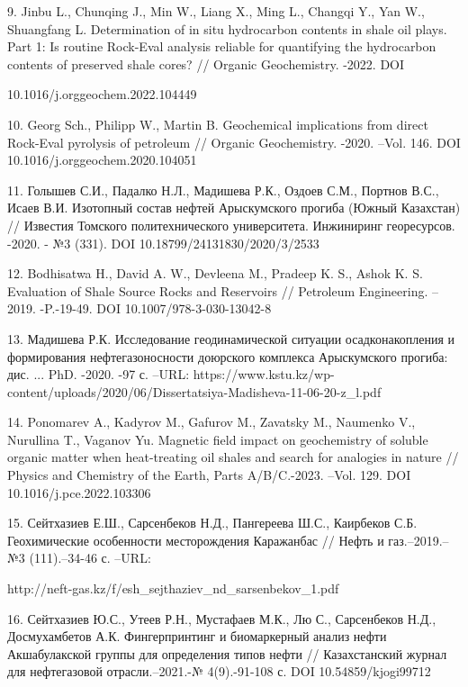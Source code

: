 \begin{noparindent}
9.
  Jinbu L., Chunqing J., Min W., Liang X., Ming L., Changqi Y., Yan W.,
  Shuangfang L. Determination of in situ hydrocarbon contents in shale
  oil plays. Part 1: Is routine Rock-Eval analysis reliable for
  quantifying the hydrocarbon contents of preserved shale cores? //
  Organic Geochemistry. -2022. DOI

  10.1016/j.orggeochem.2022.104449

10.
  Georg Sch., Philipp W., Martin B. Geochemical implications from direct
  Rock-Eval pyrolysis of petroleum // Organic Geochemistry. -2020.
  --Vol. 146. DOI 10.1016/j.orggeochem.2020.104051

11.
  Голышев С.И., Падалко Н.Л., Мадишева Р.К., Оздоев С.М., Портнов В.С.,
  Исаев В.И. Изотопный состав нефтей Арыскумского прогиба (Южный
  Казахстан) // Известия Томского политехнического университета.
  Инжиниринг георесурсов. -2020. - №3 (331). DOI
  10.18799/24131830/2020/3/2533

12.
  Bodhisatwa H., David A. W., Devleena M., Pradeep K. S., Ashok K. S.
  Evaluation of Shale Source Rocks and Reservoirs // Petroleum
  Engineering. --2019. -P.-19-49. DOI 10.1007/978-3-030-13042-8

13.
  Мадишева Р.К. Исследование геодинамической ситуации осадконакопления и
  формирования нефтегазоносности доюрского комплекса Арыскумского
  прогиба: дис. ... PhD. -2020. -97 с. --URL:
  https://www.kstu.kz/wp-content/uploads/2020/06/Dissertatsiya-Madisheva-11-06-20-z\_l.pdf

14.
  Ponomarev A., Kadyrov M., Gafurov M., Zavatsky M., Naumenko V.,
  Nurullina T., Vaganov Yu. Magnetic field impact on geochemistry of
  soluble organic matter when heat-treating oil shales and search for
  analogies in nature // Physics and Chemistry of the Earth, Parts
  A/B/C.-2023. --Vol. 129. DOI 10.1016/j.pce.2022.103306

15.
  Сейтхазиев Е.Ш., Сарсенбеков Н.Д., Пангереева Ш.С., Каирбеков С.Б.
  Геохимические особенности месторождения Каражанбас // Нефть и
  газ.--2019.--№3 (111).--34-46 с. --URL:

  http://neft-gas.kz/f/esh\_sejthaziev\_nd\_sarsenbekov\_1.pdf

16.
  Сейтхазиев Ю.С., Утеев Р.Н., Мустафаев М.К., Лю С., Сарсенбеков Н.Д.,
  Досмухамбетов А.К. Фингерпринтинг и биомаркерный анализ нефти
  Акшабулакской группы для определения типов нефти // Казахстанский
  журнал для нефтегазовой отрасли.--2021.-№ 4(9).-91-108 с. DOI
  10.54859/kjogi99712
\end{noparindent}

